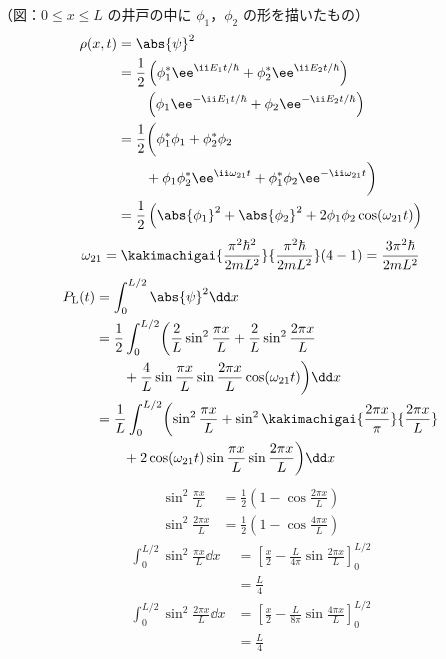 （図：$0\le x\le L$ の井戸の中に $\phi_{1}$，$\phi_{2}$ の形を描いたもの）
\begin{align*}
\rho(x,t)&=\abs{\psi}^{2}\\
&=\frac{1}{2}\left(\phi_{1}^{*}\ee^{\ii E_{1}t/\hbar}+\phi_{2}^{*}\ee^{\ii E_{2}t/\hbar}\right)\\
&\qquad\left(\phi_{1}\ee^{-\ii E_{1}t/\hbar}+\phi_{2}\ee^{-\ii E_{2}t/\hbar}\right)\\
&=\frac{1}{2}\biggl(\phi_{1}^{*}\phi_{1}+\phi_{2}^{*}\phi_{2}\\
&\qquad+\phi_{1}\phi_{2}^{*}\ee^{\ii\omega_{21}t}+\phi_{1}^{*}\phi_{2}\ee^{-\ii\omega_{21}t}\biggr)\\
&=\frac{1}{2}\left(\abs{\phi_{1}}^{2}+\abs{\phi_{2}}^{2}+2\phi_{1}\phi_{2}\cos(\omega_{21}t)\right)
\end{align*}
\[ \omega_{21}=\kakimachigai{\frac{\pi^{2}\hbar^{2}}{2mL^{2}}}{\frac{\pi^{2}\hbar}{2mL^{2}}}(4-1)=\frac{3\pi^{2}\hbar}{2mL^{2}} \]
\begin{align*}
P_{\mathrm{L}}(t)&=\int_{0}^{L/2}\abs{\psi}^{2}\dd x\\
&=\frac{1}{2}\int_{0}^{L/2}\biggl(\frac{2}{L}\sin^{2}\frac{\pi x}{L}+\frac{2}{L}\sin^{2}\frac{2\pi x}{L}\\
&\qquad+\frac{4}{L}\sin\frac{\pi x}{L}\sin\frac{2\pi x}{L}\cos(\omega_{21}t)\biggr)\dd x\\
&=\frac{1}{L}\int_{0}^{L/2}\biggl(\sin^{2}\frac{\pi x}{L}+\sin^{2}\kakimachigai{\frac{2\pi x}{\pi}}{\frac{2\pi x}{L}}\\
&\qquad+2\cos(\omega_{21}t)\sin\frac{\pi x}{L}\sin\frac{2\pi x}{L}\biggr)\dd x
\end{align*}
\begin{align*}
\sin^{2}\frac{\pi x}{L}&=\frac{1}{2}\left(1-\cos\frac{2\pi x}{L}\right)\\
\sin^{2}\frac{2\pi x}{L}&=\frac{1}{2}\left(1-\cos\frac{4\pi x}{L}\right)
\end{align*}
\begin{align*}
\int_{0}^{L/2}\sin^{2}\frac{\pi x}{L}\dd x&=\left[\frac{x}{2}-\frac{L}{4\pi}\sin\frac{2\pi x}{L}\right]_{0}^{L/2}\\
&=\frac{L}{4}\\
\int_{0}^{L/2}\sin^{2}\frac{2\pi x}{L}\dd x&=\left[\frac{x}{2}-\frac{L}{8\pi}\sin\frac{4\pi x}{L}\right]_{0}^{L/2}\\
&=\frac{L}{4}
\end{align*}
